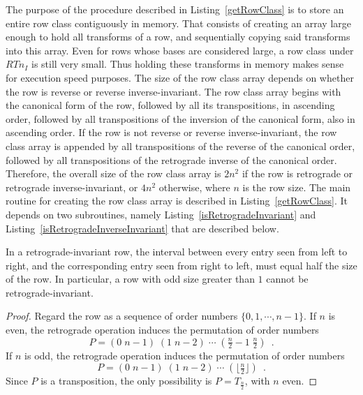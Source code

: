 The purpose of the procedure described in Listing~\ref{getRowClass} is to store an entire row class contiguously in memory. That consists of creating an array large enough to hold all transforms of a row, and sequentially copying said transforms into this array. Even for rows whose bases are considered large, a row class under $RTn_I$ is still very small. Thus holding these transforms in memory makes sense for execution speed purposes. The size of the row class array depends on whether the row is reverse or reverse inverse-invariant. The row class array begins with the canonical form of the row, followed by all its transpositions, in ascending order, followed by all transpositions of the inversion of the canonical form, also in ascending order. If the row is not reverse or reverse inverse-invariant, the row class array is appended by all transpositions of the reverse of the canonical order, followed by all transpositions of the retrograde inverse of the canonical order. Therefore, the overall size of the row class array is $2n^2$ if the row is retrograde or retrograde inverse-invariant, or $4n^2$ otherwise, where $n$ is the row size. The main routine for creating the row class array is described in Listing~\ref{getRowClass}. It depends on two subroutines, namely Listing~\ref{isRetrogradeInvariant} and Listing~\ref{isRetrogradeInverseInvariant} that are described below.

\begin{lemma}
	\label{retrograde-invariance}
	In a retrograde-invariant row, the interval between every entry seen from left to right, and the corresponding entry seen from right to left, must equal half the size of the row. In particular, a row with odd size greater than $1$ cannot be retrograde-invariant.
	\begin{proof}
	Regard the row as a sequence of order numbers $\{0, 1, \cdots, n - 1\}$. If $n$ is even, the retrograde operation induces the permutation of order numbers
	\begin{equation}
		P = (0 \; n - 1) \; (1 \; n - 2) \; \cdots \; (\tfrac{n}{2} - 1 \; \tfrac{n}{2}) \enspace .
	\end{equation}
	If $n$ is odd, the retrograde operation induces the permutation of order numbers
	\begin{equation}
		P = (0 \; n - 1) \; (1 \; n - 2) \; \cdots \; (\lfloor \tfrac{n}{2} \rfloor) \enspace .
	\end{equation}
	Since $P$ is a transposition, the only possibility is $P = T_{\frac{n}{2}}$, with $n$ even.
	\end{proof}
\end{lemma}

